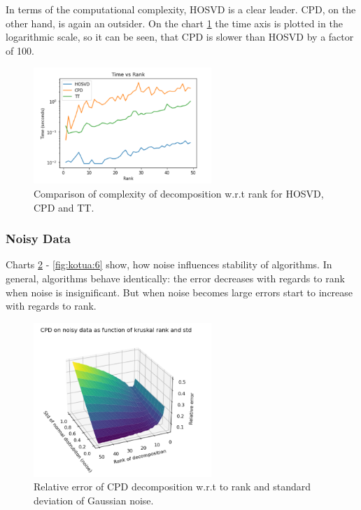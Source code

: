 \documentclass[../../main.tex]{subfiles}
\begin{document}
In terms of the computational complexity, HOSVD is a clear leader. CPD, on the other hand, is again an outsider. On the chart \ref{fig:kotua:3} the time axis is plotted in the logarithmic scale, so it can be seen, that CPD is slower than HOSVD by a factor of 100.

\begin{figure}[h!]
\centering
\includegraphics[width=0.6\textwidth]{figures/times}
\caption{Comparison of complexity of decomposition w.r.t rank for HOSVD, CPD and TT.}
\label{fig:kotua:3}
\end{figure}

\subsubsection{Noisy Data}

Charts \ref{fig:kotua:4} - \ref{fig:kotua:6} show, how noise influences stability of algorithms. In general, algorithms behave identically: the error decreases with regards to rank when noise is insignificant. But when noise becomes large errors start to increase with regards to rank.

\begin{figure}[h!]
\centering
\includegraphics[width=0.6\textwidth]{figures/cpd}
\caption{Relative error of CPD decomposition w.r.t to rank and standard deviation of Gaussian noise.}
\label{fig:kotua:4}
\end{figure}
\end{document}

